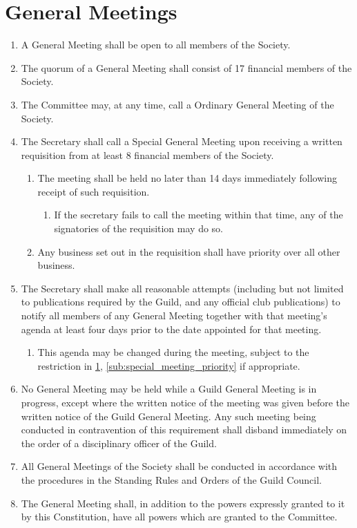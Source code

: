 \documentclass[a4paper]{article}
\begin{document}
\section{General Meetings} \label{sec:general_meetings}
\begin{enumerate}
	\item A General Meeting shall be open to all members of the Society.
	\item The quorum of a General Meeting shall consist of 17 financial members of the Society.
    \item The Committee may, at any time, call a Ordinary General Meeting of the Society.
    \item The Secretary shall call a Special General Meeting upon receiving a written requisition from at least 8 financial members of the Society.
    \begin{enumerate}
        \item The meeting shall be held no later than 14 days immediately following receipt of such requisition. 
        \begin{enumerate}
            \item If the secretary fails to call the meeting within that time, any of the signatories of the requisition may do so.
        \end{enumerate}
        \item \label{sub:special_meeting_priority} Any business set out in the requisition shall have priority over all other business. 
    \end{enumerate}
    \item The Secretary shall make all reasonable attempts (including but not limited to publications required by the Guild, and any official club publications) to notify all members of any General Meeting together with that meeting's agenda at least four days prior to the date appointed for that meeting.
    \begin{enumerate}
        \item This agenda may be changed during the meeting, subject to the restriction in \cref{sec:general_meetings}, \cref{sub:special_meeting_priority} if appropriate.
    \end{enumerate}
    \item No General Meeting may be held while a Guild General Meeting is in progress, except where the written notice of the meeting was given before the written notice of the Guild General Meeting. Any such meeting being conducted in contravention of this requirement shall disband immediately on the order of a disciplinary officer of the Guild.
    \item All General Meetings of the Society shall be conducted in accordance with the procedures in the Standing Rules and Orders of the Guild Council.
    \item The General Meeting shall, in addition to the powers expressly granted to it by this Constitution, have all powers which are granted to the Committee.
\end{enumerate}
\end{document}
